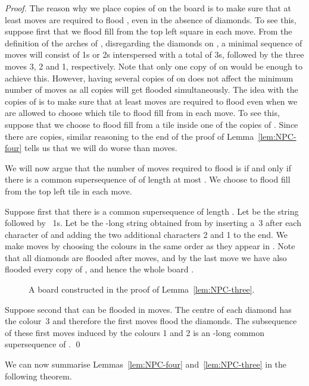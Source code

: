 \documentclass[a4paper,11pt]{llncs}
\newcommand{\pgfgraphic}[1]{}
\newcounter{l}
\begin{document}
\begin{proof}
    The reason why we place copies of  on the board  is to make sure that at least  moves are required to flood , even in the absence of diamonds. To see this, suppose first that we flood fill from the top left square in each move. From the definition of the arches of , disregarding the diamonds on , a minimal sequence of moves will consist of  1s or 2s interspersed with a total of  3s, followed by the three moves 3, 2 and 1, respectively. Note that only one copy of  on  would be enough to achieve this. However, having several copies of  on  does not affect the minimum number of moves as all copies will get flooded simultaneously. The idea with the  copies of  is to make sure that at least  moves are required to flood  even when we are allowed to choose which tile to flood fill from in each move. To see this, suppose that we choose to flood fill from a tile inside one of the copies of . Since there are  copies, similar reasoning to the end of the proof of Lemma~\ref{lem:NPC-four} tells us that we will do worse than  moves.



    We will now argue that the number of moves required to flood  is  if and only if there is a common supersequence of  of length at most . We choose to flood fill from the top left tile in each move.

    Suppose first that there is a common supersequence  of length . Let  be the string  followed by ~1s. Let  be the -long string obtained from  by inserting a~3 after each character of  and adding the two additional characters 2 and 1 to the end. We make  moves by choosing the colours in the same order as they appear in . Note that all diamonds are flooded after  moves, and by the last move we have also flooded every copy of , and hence the whole board .

\begin{figure}[t]
\centering
	\pgfgraphic{graphic-npc2}
\caption{A board constructed in the proof of Lemma~\ref{lem:NPC-three}.}
\label{fig:NPC2}
\end{figure}

    Suppose second that  can be flooded in  moves. The centre of each diamond has the colour~3 and therefore the first  moves flood the diamonds. The subsequence of these first  moves induced by the colours 1 and 2 is an -long common supersequence of .
    \qed
\end{proof}

We can now summarise Lemmas~\ref{lem:NPC-four} and~\ref{lem:NPC-three} in the following theorem.
\end{document}
